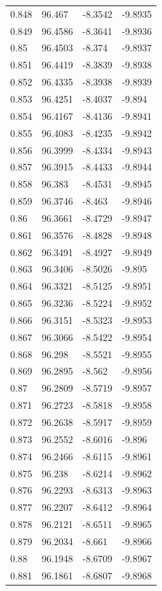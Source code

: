 \begin{tabular}{llll}
0.848 & 96.467 & -8.3542 & -9.8935 \\
0.849 & 96.4586 & -8.3641 & -9.8936 \\
0.85 & 96.4503 & -8.374 & -9.8937 \\
0.851 & 96.4419 & -8.3839 & -9.8938 \\
0.852 & 96.4335 & -8.3938 & -9.8939 \\
0.853 & 96.4251 & -8.4037 & -9.894 \\
0.854 & 96.4167 & -8.4136 & -9.8941 \\
0.855 & 96.4083 & -8.4235 & -9.8942 \\
0.856 & 96.3999 & -8.4334 & -9.8943 \\
0.857 & 96.3915 & -8.4433 & -9.8944 \\
0.858 & 96.383 & -8.4531 & -9.8945 \\
0.859 & 96.3746 & -8.463 & -9.8946 \\
0.86 & 96.3661 & -8.4729 & -9.8947 \\
0.861 & 96.3576 & -8.4828 & -9.8948 \\
0.862 & 96.3491 & -8.4927 & -9.8949 \\
0.863 & 96.3406 & -8.5026 & -9.895 \\
0.864 & 96.3321 & -8.5125 & -9.8951 \\
0.865 & 96.3236 & -8.5224 & -9.8952 \\
0.866 & 96.3151 & -8.5323 & -9.8953 \\
0.867 & 96.3066 & -8.5422 & -9.8954 \\
0.868 & 96.298 & -8.5521 & -9.8955 \\
0.869 & 96.2895 & -8.562 & -9.8956 \\
0.87 & 96.2809 & -8.5719 & -9.8957 \\
0.871 & 96.2723 & -8.5818 & -9.8958 \\
0.872 & 96.2638 & -8.5917 & -9.8959 \\
0.873 & 96.2552 & -8.6016 & -9.896 \\
0.874 & 96.2466 & -8.6115 & -9.8961 \\
0.875 & 96.238 & -8.6214 & -9.8962 \\
0.876 & 96.2293 & -8.6313 & -9.8963 \\
0.877 & 96.2207 & -8.6412 & -9.8964 \\
0.878 & 96.2121 & -8.6511 & -9.8965 \\
0.879 & 96.2034 & -8.661 & -9.8966 \\
0.88 & 96.1948 & -8.6709 & -9.8967 \\
0.881 & 96.1861 & -8.6807 & -9.8968 \\

\end{tabular}
